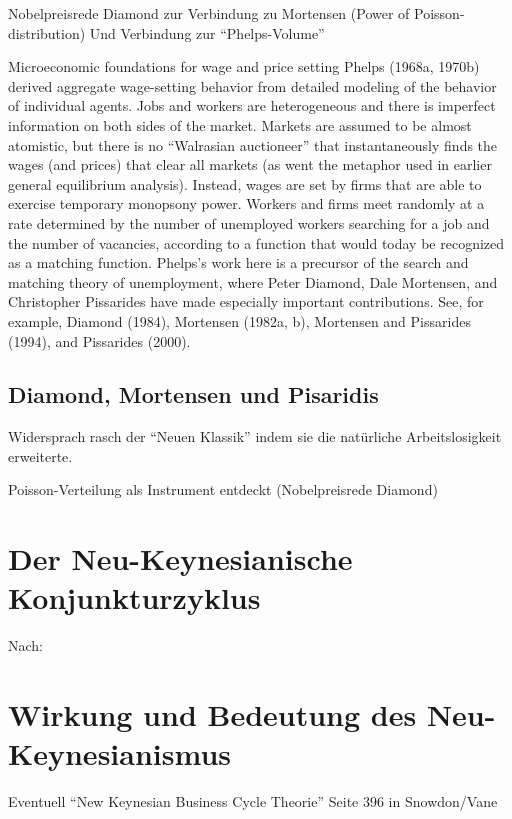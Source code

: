 Nobelpreisrede Diamond zur Verbindung zu Mortensen (Power of Poisson-distribution)
Und Verbindung zur "`Phelps-Volume"'



Microeconomic foundations for wage and price setting
Phelps (1968a, 1970b) derived aggregate wage-setting behavior from detailed modeling of the 
behavior of individual agents. Jobs and workers are heterogeneous and there is imperfect 
information on both sides of the market. Markets are assumed to be almost atomistic, but there is 
no “Walrasian auctioneer” that instantaneously finds the wages (and prices) that clear all markets 
(as went the metaphor used in earlier general equilibrium analysis). Instead, wages are set by 
firms that are able to exercise temporary monopsony power. Workers and firms meet randomly 
at a rate determined by the number of unemployed workers searching for a job and the number of 
vacancies, according to a function that would today be recognized as a matching function. 
Phelps’s work here is a precursor of the search and matching theory of unemployment, where 
Peter Diamond, Dale Mortensen, and Christopher Pissarides have made especially important 
contributions. \parencite{Nobelpreis-Komitee2006}  See, for example, Diamond (1984), Mortensen (1982a, b), Mortensen and Pissarides (1994), and Pissarides 
(2000).


\subsection{Diamond, Mortensen und Pisaridis}

Widersprach rasch der "`Neuen Klassik"' indem sie die natürliche Arbeitslosigkeit erweiterte.

Poisson-Verteilung als Instrument entdeckt (Nobelpreisrede Diamond)



\section{Der Neu-Keynesianische Konjunkturzyklus}

Nach:
\textcite{Yellen1984}
\textcite[S. 396]{Snowdon2005}



\section{Wirkung und Bedeutung des Neu-Keynesianismus}
Eventuell "`New Keynesian Business Cycle Theorie"' Seite 396 in Snowdon/Vane

